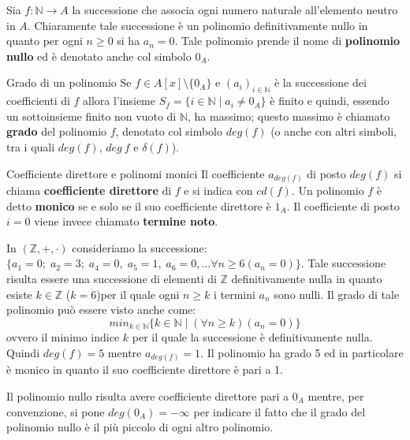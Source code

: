 \begin{example}
	Sia $f:\mathbb{N} \rightarrow A$ la successione che associa ogni numero naturale all'elemento neutro in $A$. Chiaramente tale successione è un polinomio definitivamente nullo in quanto per ogni $n \geq 0$ si ha $a_{n}=0$. Tale polinomio prende il nome di \textbf{polinomio nullo} ed è denotato anche col simbolo $0_{A}$.
\end{example}


\begin{defbox}{Grado di un polinomio}
	Se $f \in A[x] \setminus \{0_{A}\}$ e $(a_{i})_{i \in \mathbb{N}}$ è la successione dei coefficienti di $f$ allora l'insieme $S_{f} = \{i \in \mathbb{N} \; | \; a_{i} \neq 0_{A} \}$ è finito e quindi, essendo un sottoinsieme finito non vuoto di $\mathbb{N}$, ha massimo; questo massimo è chiamato \textbf{grado} del polinomio $f$, denotato col simbolo $deg(f)$ (o anche con altri simboli, tra i quali $deg (f)$, $deg \ f$ e $\delta(f)$).
\end{defbox}

\begin{defbox}{Coefficiente direttore e polinomi monici}
	Il coefficiente $a_{deg(f)}$ di posto $deg(f)$ si chiama \textbf{coefficiente direttore} di $f$ e si indica con $cd (f)$. Un polinomio $f$ è detto \textbf{monico} se e solo se il suo coefficiente direttore è $1_{A}$. Il coefficiente di posto $i=0$ viene invece chiamato \textbf{termine noto}.
\end{defbox}


\begin{osservation}
	In $(\mathbb{Z},+,\cdot)$ consideriamo la successione: $\{a_{1}=0;\; a_{2}=3;\; a_{4}=0, \; a_{5}=1, \; a_{6}= 0, \ldots \forall n \geq 6 (a_{n}=0)\}$. Tale successione risulta essere una successione di elementi di $\mathbb{Z}$ definitivamente nulla in quanto esiste $k \in \mathbb{Z}$ ($k=6$)per il quale ogni $n \geq k$ i termini $a_{n}$ sono nulli. Il grado di tale polinomio può essere visto anche come:
	\begin{displaymath}
		min_{k \in \mathbb{N}} \{k \in \mathbb{N} \; | \; (\forall n \geq k) (a_{n}=0)\}
	\end{displaymath}
	ovvero il minimo indice $k$ per il quale la successione è definitivamente nulla. Quindi $deg(f)=5$ mentre $a_{deg(f)}=1$. Il polinomio ha grado 5 ed in particolare è monico in quanto il suo coefficiente direttore è pari a 1.

	Il polinomio nullo risulta avere coefficiente direttore pari a $0_{A}$ mentre, per convenzione, si pone $deg(0_{A})=-\infty$ per indicare il fatto che il grado del polinomio nullo è il più piccolo di ogni altro polinomio.
\end{osservation}

